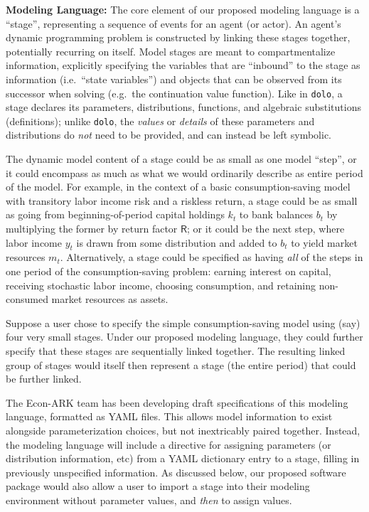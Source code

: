 \documentclass[12pt,pdftex,letterpaper]{article}
\begin{document}
\vspace{0.35cm}

\noindent \textbf{Modeling Language:} The core element of our proposed modeling language is a ``stage'', representing a sequence of events for an agent (or actor). An agent's dynamic programming problem is constructed by linking these stages together, potentially recurring on itself. Model stages are meant to compartmentalize information, explicitly specifying the variables that are ``inbound'' to the stage as information (i.e.\ ``state variables'') and objects that can be observed from its successor when solving (e.g.\ the continuation value function). Like in \texttt{dolo}, a stage declares its parameters, distributions, functions, and algebraic substitutions (definitions); unlike \texttt{dolo}, the \textit{values} or \textit{details} of these parameters and distributions do \textit{not} need to be provided, and can instead be left symbolic.

The dynamic model content of a stage could be as small as one model ``step'', or it could encompass as much as what we would ordinarily describe as entire period of the model. For example, in the context of a basic consumption-saving model with transitory labor income risk and a riskless return, a stage could be as small as going from beginning-of-period capital holdings $k_t$ to bank balances $b_t$ by multiplying the former by return factor $\mathsf{R}$; or it could be the next step, where labor income $y_t$ is drawn from some distribution and added to $b_t$ to yield market resources $m_t$. Alternatively, a stage could be specified as having \textit{all} of the steps in one period of the consumption-saving problem: earning interest on capital, receiving stochastic labor income, choosing consumption, and retaining non-consumed market resources as assets.

Suppose a user chose to specify the simple consumption-saving model using (say) four very small stages. Under our proposed modeling language, they could further specify that these stages are sequentially linked together. The resulting linked group of stages would itself then represent a stage (the entire period) that could be further linked.

The Econ-ARK team has been developing draft specifications of this modeling language, formatted as YAML files. This allows model information to exist alongside parameterization choices, but not inextricably paired together. Instead, the modeling language will include a directive for assigning parameters (or distribution information, etc) from a YAML dictionary entry to a stage, filling in previously unspecified information. As discussed below, our proposed software package would also allow a user to import a stage into their modeling environment without parameter values, and \textit{then} to assign values.
\end{document}
